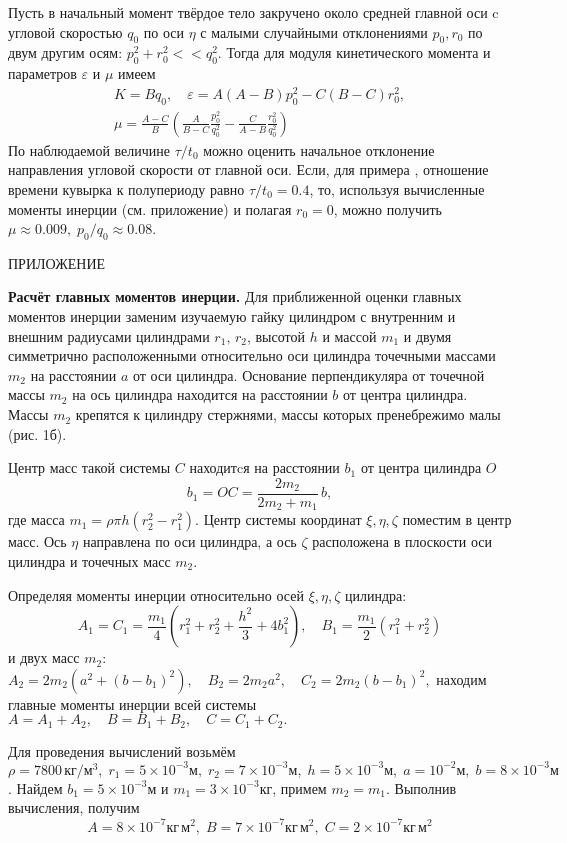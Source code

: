 \documentclass[14pt,a4paper]{extarticle}
\def\DS{\displaystyle}
\def\eps{\varepsilon}
\begin{document}
Пусть в начальный момент твёрдое тело закручено около средней главной оси c угловой скоростью $q_0$ по оси $\eta$ с малыми случайными отклонениями $p_0, r_0$  по двум другим осям: $p_0^2+r_0^2<<q_0^2$. Тогда для модуля кинетического момента и параметров $\eps$ и $\mu$ имеем
$$
\begin{array}{c}
\DS K=Bq_{0},\quad \eps =A\left( A-B\right) p_{0}^{2}-C\left( B-C\right)
r_{0}^{2},\\[2ex]
\DS \mu = \frac{A-C}{B}\left(\frac{A}{B-C}\frac{p_0^2}{q_0^2}-\frac{C}{A-B}\frac{r_0^2}{q_0^2}\right)
\end{array}
$$
По наблюдаемой величине $\tau/t_0$ можно оценить начальное отклонение направления угловой скорости от главной оси.  Если, для примера \cite{video}, отношение времени кувырка к полупериоду равно $\tau/t_0=0.4$, то, используя вычисленные моменты инерции (см. приложение) и полагая $r_0=0$, можно получить $\mu\approx 0.009,\;{p_0}/{q_0}\approx 0.08$.


\bigskip


ПРИЛОЖЕНИЕ

{\bf Расчёт главных моментов инерции.} Для приближенной оценки главных моментов инерции заменим изучаемую гайку цилиндром с внутренним и внешним радиусами цилиндрами $r_1,\,r_2$, высотой $h$ и массой $m_1$ и двумя симметрично расположенными относительно оси цилиндра точечными массами $m_2$ на расстоянии $a$ от оси цилиндра. Основание перпендикуляра от точечной массы $m_2$ на ось цилиндра находится на расстоянии $b$ от центра цилиндра. Массы $m_2$ крепятся к цилиндру стержнями, массы которых пренебрежимо малы (рис. 1б).

Центр масс такой системы $C$ находитcя на расстоянии $b_1$ от центра цилиндра $O$
$$
b_1=OC=\frac{2m_2}{2m_2+m_1}\,b,
$$
где масса $m_1=\rho\pi h(r_2^2-r_1^2).$
Центр системы координат $\xi,\eta,\zeta$ поместим в центр масс. Ось $\eta$ направлена по оси цилиндра, а ось $\zeta$ расположена в плоскости  оси цилиндра и точечных масс $m_2$.

Определяя моменты инерции относительно осей $\xi,\eta,\zeta$ цилиндра:
$$
A_1=C_1=\frac{m_1}{4}(r_1^2+r_2^2+\frac{h^2}{3}+4b_1^2),\quad B_1=\frac{m_1}{2}(r_1^2+r_2^2)
$$
и двух масс $m_2$: $
A_2=2m_2\left(a^2+(b-b_1)^2\right),\quad B_2=2m_2a^2,\quad C_2=2m_2(b-b_1)^2,
$
находим главные моменты инерции всей системы
$
A=A_1+A_2,\quad B=B_1+B_2,\quad C=C_1+C_2.
$

Для проведения вычислений возьмём $\rho=7800\, кг/м^3,\;r_1=5\times 10^{-3}м,\;r_2=7\times 10^{-3}м,\;h=5\times 10^{-3}м,\;a=10^{-2}м,\;b=8\times 10^{-3}м$. Найдем $b_1=5\times 10^{-3}м$ и $m_1=3\times 10^{-3}кг$, примем $m_2=m_1$.\newline
Выполнив вычисления, получим
$$A=8\times 10^{-7}кг\,м^2,\;B=7\times 10^{-7}кг\,м^2,\;C=2\times 10^{-7}кг\,м^2$$
\end{document}
